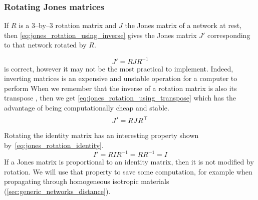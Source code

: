 \subsubsection{Rotating Jones matrices}
\label{sec:rotating_jones_matrices}
If $R$ is a 3--by--3 rotation matrix and $J$ the Jones matrix of a network at rest,
then \cref{eq:jones_rotation_using_inverse} gives the Jones matrix $J'$ corresponding to that network rotated by $R$.

\begin{equation}
    J' = R J R^{-1}
    \label{eq:jones_rotation_using_inverse}
\end{equation}
 is correct, however it may not be the most practical to implement.
Indeed, inverting matrices is an expensive and unstable operation for a computer to perform
When we remember that the inverse of a rotation matrix is also its transpose%
,
then we get \cref{eq:jones_rotation_using_transpose} which has the advantage of being computationally cheap and stable.
\begin{equation}
    J' = R J R^\top
    \label{eq:jones_rotation_using_transpose}
\end{equation}

Rotating the identity matrix has an interesting property shown by~\eqref{eq:jones_rotation_identity}.
\begin{equation}
    I' = R I R^{-1}
       = R R^{-1}
       = I
    \label{eq:jones_rotation_identity}
\end{equation}
If a Jones matrix is proportional to an identity matrix, then it is not modified by rotation.
We will use that property to save some computation, for example when propagating through homogeneous isotropic materials (\vref{sec:generic_networks_distance}).



